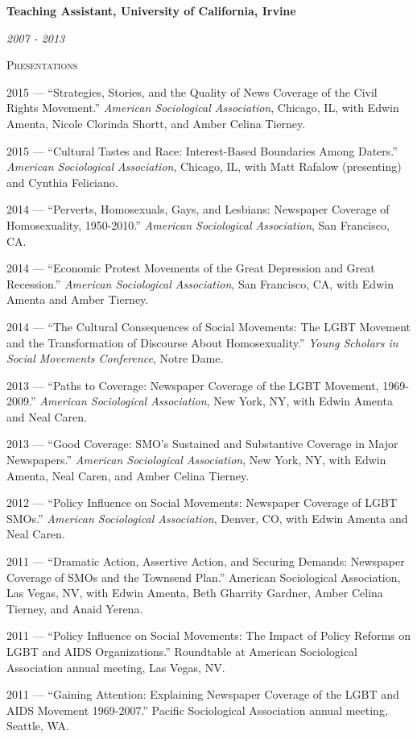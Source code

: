 \documentclass[11pt]{article}
\newcommand{\sectionheader}[1]{
{\Large
\textsc{#1}}
}
\newcommand{\resumeitem}[2]{
\begin{minipage}{0.7\textwidth}
\begin{flushleft}
\textbf{#1}
\end{flushleft}
\end{minipage}
\begin{minipage}{0.3\textwidth}
\begin{flushright}
\emph{#2}
\end{flushright}
\end{minipage}
\hangindent=0.05\textwidth
}
\begin{document}
\resumeitem{Teaching Assistant, University of California, Irvine}{2007 - 2013}


\sectionheader{Presentations}

2015 --- ``Strategies, Stories, and the Quality of News Coverage of the Civil Rights Movement.'' \textit{American Sociological Association}, Chicago, IL, with Edwin Amenta, Nicole Clorinda Shortt, and Amber Celina Tierney.

2015 --- ``Cultural Tastes and Race: Interest-Based Boundaries Among Daters.'' \textit{American Sociological Association}, Chicago, IL, with Matt Rafalow (presenting) and Cynthia Feliciano.

2014 --- ``Perverts, Homosexuals, Gays, and Lesbians: Newspaper Coverage of Homosexuality, 1950-2010.'' \textit{American Sociological Association}, San Francisco, CA. 

2014 --- ``Economic Protest Movements of the Great Depression and Great Recession.'' \textit{American Sociological Association}, San Francisco, CA, with Edwin Amenta and Amber Tierney.

2014 --- ``The Cultural Consequences of Social Movements: The LGBT Movement and the Transformation of Discourse About Homosexuality.'' \textit{Young Scholars in Social Movements Conference}, Notre Dame.

2013 --- ``Paths to Coverage: Newspaper Coverage of the LGBT Movement, 1969-2009.'' \textit{American Sociological Association}, New York, NY, with Edwin Amenta and Neal Caren.

2013 --- ``Good Coverage: SMO's Sustained and Substantive Coverage in Major Newspapers.'' \textit{American Sociological Association}, New York, NY, with Edwin Amenta, Neal Caren, and Amber Celina Tierney.

2012 --- ``Policy Influence on Social Movements: Newspaper Coverage of LGBT SMOs.'' \textit{American Sociological Association}, Denver, CO, with Edwin Amenta and Neal Caren.

2011 --- ``Dramatic Action, Assertive Action, and Securing Demands: Newspaper Coverage of SMOs and the Townsend Plan.'' American Sociological Association, Las Vegas, NV, with Edwin Amenta, Beth Gharrity Gardner, Amber Celina Tierney, and Anaid Yerena.

2011 --- ``Policy Influence on Social Movements: The Impact of Policy Reforms on LGBT and AIDS Organizations.'' Roundtable at American Sociological Association annual meeting, Las Vegas, NV.

2011 --- ``Gaining Attention: Explaining Newspaper Coverage of the LGBT and AIDS Movement 1969-2007.'' Pacific Sociological Association annual meeting, Seattle, WA.
\end{document}
